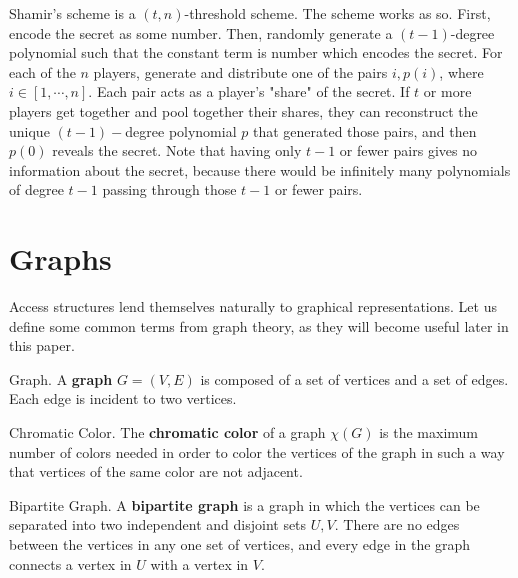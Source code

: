 Shamir's scheme is a $(t,n)$-threshold scheme. The scheme works as so. First, encode the secret as some number. Then, randomly generate a $(t-1)$-degree polynomial such that the constant term is number which encodes the secret. For each of the $n$ players, generate and distribute one of the pairs $i, p(i)$, where $i \in [1, \cdots, n]$. Each pair acts as a player's "share" of the secret. If $t$ or more players get together and pool together their shares, they can reconstruct the unique $(t-1)-$degree polynomial $p$ that generated those pairs, and then $p(0)$ reveals the secret. Note that having only $t-1$ or fewer pairs gives no information about the secret, because there would be infinitely many polynomials of degree $t-1$ passing through those $t-1$ or fewer pairs.

\section{Graphs}
\label{sec:graphs}

Access structures lend themselves naturally to graphical representations. Let us define some common terms from graph theory, as they will become useful later in this paper. 

\begin{definition}{Graph.}
    \label{defn:graph}
    A \textbf{graph} $G=(V,E)$ is composed of a set of vertices and a set of edges. Each edge is incident to two vertices.
\end{definition}


\begin{definition}{Chromatic Color.}
    \label{defn:colors}
	The \textbf{chromatic color} of a graph $\chi(G)$ is the maximum number of colors needed in order to color the vertices of the graph in such a way that vertices of the same color are not adjacent.
\end{definition}

\begin{definition}{Bipartite Graph.}
    \label{defn:bipartite}
	A \textbf{bipartite graph} is a graph in which the vertices can be separated into two independent and disjoint sets $U,V$. There are no edges between the vertices in any one set of vertices, and every edge in the graph connects a vertex in $U$ with a vertex in $V$.
\end{definition}

